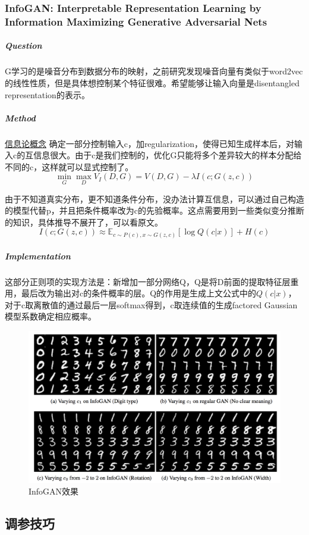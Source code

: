 \documentclass[a4paper]{article}
\begin{document}
\subsubsection{InfoGAN: Interpretable Representation Learning by Information Maximizing Generative Adversarial Nets\cite{DBLP:journals/corr/ChenDHSSA16}}

 \subparagraph{Question}
G学习的是噪音分布到数据分布的映射，之前研究发现噪音向量有类似于word2vec的线性性质，但是具体想控制某个特征很难。希望能够让输入向量是disentangled representation的表示。
\subparagraph{Method}
\href{https://sleepychord.gitbooks.io/volume1/content/xin-xi-lun-ji-chu.html}{信息论概念} 
确定一部分控制输入c，加regularization，使得已知生成样本后，对输入c的互信息很大。由于c是我们控制的，优化G只能将多个差异较大的样本分配给不同的c，这样就可以显式控制了。
$$\min\limits_G\max\limits_D V_I(D,G)=V(D,G) - \lambda I(c;G(z,c))$$

由于不知道真实分布，更不知道条件分布，没办法计算互信息，可以通过自己构造的模型代替p，并且把条件概率改为c的先验概率。这点需要用到一些类似变分推断的知识，具体推导不展开了，可以看原文。
$$I(c;G(z,c))\approx \mathbb{E}_{c\sim P(c), x\sim G(z,c)}[\log Q(c|x)] + H(c)$$
\subparagraph{Implementation}
这部分正则项的实现方法是：新增加一部分网络Q，Q是将D前面的提取特征层重用，最后改为输出对c的条件概率的层。Q的作用是生成上文公式中的$Q(c|x)$，对于c取离散值的通过最后一层softmax得到，c取连续值的生成factored Gaussian模型系数确定相应概率。
\begin{figure}
\centering
\includegraphics[width=\textwidth]{./img/17.png}
\caption{InfoGAN效果}
\label{fig:17}
\end{figure}
\subsection{调参技巧}
\end{document}
